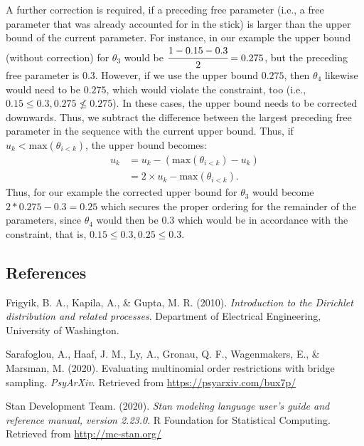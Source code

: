 \documentclass[
  english,
  man,floatsintext]{apa6}
\newlength{\cslhangindent}
\newenvironment{cslreferences}%
  {\setlength{\parindent}{0pt}%
  \everypar{\setlength{\hangindent}{\cslhangindent}}\ignorespaces}%
  {\par}
\begin{document}
\begin{appendix}
A further correction is required, if a preceding free parameter (i.e., a
free parameter that was already accounted for in the stick) is larger
than the upper bound of the current parameter. For instance, in our
example the upper bound (without correction) for \(\theta_3\) would be
\(\cfrac{1 - 0.15 - 0.3}{2} = 0.275\), but the preceding free parameter
is \(0.3\). However, if we use the upper bound \(0.275\), then
\(\theta_4\) likewise would need to be \(0.275\), which would violate
the constraint, too (i.e., \(0.15 \leq 0.3, 0.275 \nleq 0.275\)). In
these cases, the upper bound needs to be corrected downwards. Thus, we
subtract the difference between the largest preceding free parameter in
the sequence with the current upper bound. Thus, if
\(u_k < \text{max}(\theta_{i < k})\), the upper bound becomes:
\begin{align}
u_k &= u_k - (\text{max}(\theta_{i < k}) - u_k) \\
&= 2 \times u_k - \text{max}(\theta_{i < k}).
\end{align} Thus, for our example the corrected upper bound for
\(\theta_3\) would become \(2*0.275 - 0.3 = 0.25\) which secures the
proper ordering for the remainder of the parameters, since \(\theta_4\)
would then be \(0.3\) which would be in accordance with the constraint,
that is, \(0.15 \leq 0.3, 0.25 \leq 0.3\).

\hypertarget{references}{%
\subsection{References}\label{references}}

\begingroup
\setlength{\parindent}{-0.5in}
\setlength{\leftskip}{0.5in}

\hypertarget{refs}{}
\begin{cslreferences}
\leavevmode\hypertarget{ref-frigyik2010introduction}{}%
Frigyik, B. A., Kapila, A., \& Gupta, M. R. (2010). \emph{Introduction
to the Dirichlet distribution and related processes}. Department of
Electrical Engineering, University of Washington.

\leavevmode\hypertarget{ref-sarafoglou2020evaluatingPreprint}{}%
Sarafoglou, A., Haaf, J. M., Ly, A., Gronau, Q. F., Wagenmakers, E., \&
Marsman, M. (2020). Evaluating multinomial order restrictions with
bridge sampling. \emph{PsyArXiv}. Retrieved from
\url{https://psyarxiv.com/bux7p/}

\leavevmode\hypertarget{ref-stan2020}{}%
Stan Development Team. (2020). \emph{Stan modeling language user's guide
and reference manual, version 2.23.0}. R Foundation for Statistical
Computing. Retrieved from \url{http://mc-stan.org/}
\end{cslreferences}

\endgroup
\end{appendix}
\end{document}
